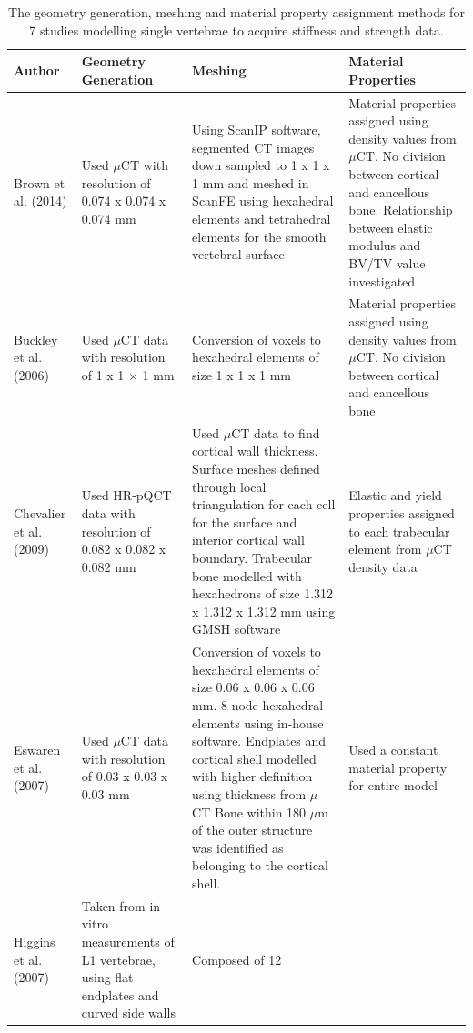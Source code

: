 \begin{landscape}

\begin{longtable}{P{0.2\textheight}|P{0.2\textheight}|P{0.7\textheight}|P{0.5\textheight}}
\caption{The geometry generation, meshing and material property
assignment methods for 7 studies modelling single vertebrae to acquire
stiffness and strength data.}
\label{tab:geoNmesh}
\\
Author & Geometry Generation & Meshing & Material Properties \\
\hline
\hline
Brown et al. (2014) \cite{RobsonBrown2014} & Used $\mu$CT with resolution of 0.074 x
0.074 x 0.074 mm & Using ScanIP software, segmented CT images down sampled to 1
x 1 x 1 mm and meshed in ScanFE using hexahedral elements and
tetrahedral elements for the smooth vertebral surface & Material
properties assigned using density values from $\mu$CT. No division between
cortical and cancellous bone. Relationship between elastic modulus and
BV/TV value investigated\\
 \hline
 Buckley et al. (2006) \cite{Buckley2006} & Used $\mu$CT data with resolution of 1 x 1
$\times$
1 mm &
Conversion of voxels to hexahedral elements of size 1 x 1 x 1 mm &
Material properties assigned using density values from $\mu$CT. No division
between cortical and cancellous bone\\
\hline
Chevalier et al. (2009) \cite{Chevalier2009} & Used HR-pQCT data with resolution of
0.082 x
0.082 x 0.082 mm & Used $\mu$CT data to find cortical wall thickness.
Surface meshes defined through local triangulation for each cell for the
surface and interior cortical wall boundary. Trabecular bone modelled
with hexahedrons of size 1.312 x 1.312 x 1.312 mm using GMSH software &
Elastic and yield properties assigned to each trabecular element from
$\mu$CT density data\\
\hline
Eswaren et al. (2007) \cite{Eswaran2007} & Used $\mu$CT data with resolution of 0.03 x
0.03 x
0.03 mm & Conversion of voxels to hexahedral elements of size 0.06 x
0.06 x 0.06 mm. 8 node hexahedral elements using in-house software.
Endplates and cortical shell modelled with higher definition using
thickness from $\mu$CT Bone within 180 $\mu$m of the outer structure was
identified as belonging to the cortical shell. & Used a constant
material property for entire model\\
\hline
Higgins et al. (2007) \cite{Higgins2007a} & Taken from in vitro measurements of L1
vertebrae, using flat endplates and curved side walls & Composed of 12

\end{longtable}
\end{landscape}
